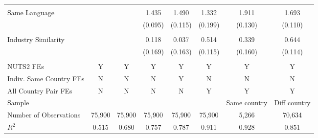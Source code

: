 {\begin{tabular}{l*{7}{c}}
            &                     &                     &                     &                     &                     &                     &                     \\
Same Language&                     &                     &       1.435\sym{***}&       1.490\sym{***}&       1.332\sym{***}&       1.911\sym{***}&       1.693\sym{***}\\
            &                     &                     &     (0.095)         &     (0.115)         &     (0.199)         &     (0.130)         &     (0.110)         \\
            &                     &                     &                     &                     &                     &                     &                     \\
Industry Similarity&                     &                     &       0.118         &       0.037         &       0.514\sym{***}&       0.339\sym{**} &       0.644\sym{***}\\
            &                     &                     &     (0.169)         &     (0.163)         &     (0.115)         &     (0.160)         &     (0.114)         \\
            &                     &                     &                     &                     &                     &                     &                     \\
\hline
NUTS2 FEs   &           Y         &           Y         &           Y         &           Y         &           Y         &           Y         &           Y         \\
Indiv. Same Country FEs&           N         &           N         &           N         &           Y         &           N         &           N         &           N         \\
All Country Pair FEs&           N         &           N         &           N         &           N         &           Y         &           Y         &           Y         \\
Sample      &                     &                     &                     &                     &                     &Same country         &Diff country         \\
Number of Observations&      75,900         &      75,900         &      75,900         &      75,900         &      75,900         &       5,266         &      70,634         \\
$R^2$       &       0.515         &       0.680         &       0.757         &       0.787         &       0.911         &       0.928         &       0.851         \\
\hline\hline
\end{tabular}
}

